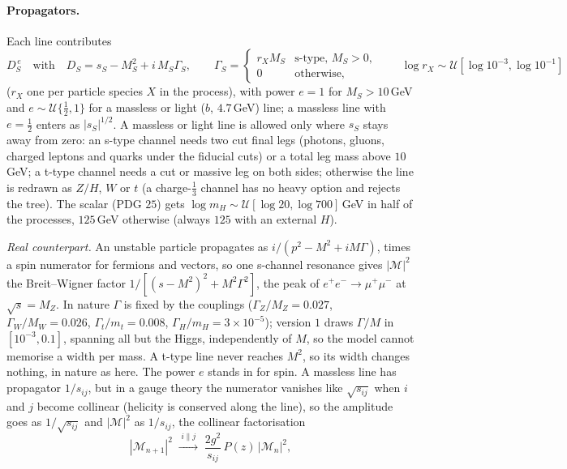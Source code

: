 \documentclass[11pt]{article}
\begin{document}
\paragraph{Propagators.} Each line contributes
\begin{equation}
  D_S^{\,e}\quad\text{with}\quad D_S=s_S-M_S^2+i\,M_S\Gamma_S,\qquad
  \Gamma_S=\begin{cases} r_X M_S & \text{s-type, } M_S>0,\\ 0 & \text{otherwise,}\end{cases}\qquad
  \log r_X\sim\mathcal U[\log10^{-3},\log10^{-1}]
  \label{eq:syn-prop}
\end{equation}
($r_X$ one per particle species $X$ in the process), with power $e=1$ for $M_S>10$\,GeV and $e\sim\mathcal U\{\tfrac12,1\}$
for a massless or light ($b$, $4.7$\,GeV) line; a massless line with $e=\tfrac12$ enters as $|s_S|^{1/2}$. A massless or
light line is allowed only where $s_S$ stays away from zero: an s-type channel needs two cut final legs (photons, gluons,
charged leptons and quarks under the fiducial cuts) or a total leg mass above $10$\,GeV; a t-type channel needs a cut or
massive leg on both sides; otherwise the line is redrawn as $Z/H$, $W$ or $t$ (a charge-$\tfrac13$ channel has no heavy
option and rejects the tree). The scalar (PDG $25$) gets $\log m_H\sim\mathcal U[\log20,\log700]$\,GeV in half of the
processes, $125$\,GeV otherwise (always $125$ with an external $H$).
\par\smallskip\noindent \emph{Real counterpart.} An unstable particle propagates as $i/(p^2-M^2+iM\Gamma)$, times a spin numerator for fermions
and vectors, so one s-channel resonance gives $|\mathcal M|^2$ the Breit--Wigner factor $1/[(s-M^2)^2+M^2\Gamma^2]$, the
peak of $e^+e^-\to\mu^+\mu^-$ at $\sqrt s=M_Z$. In nature $\Gamma$ is fixed by the couplings ($\Gamma_Z/M_Z=0.027$,
$\Gamma_W/M_W=0.026$, $\Gamma_t/m_t=0.008$, $\Gamma_H/m_H=3\times10^{-5}$); version $1$ draws $\Gamma/M$ in
$[10^{-3},0.1]$, spanning all but the Higgs, independently of $M$, so the model cannot memorise a width per mass. A
t-type line never reaches $M^2$, so its width changes nothing, in nature as here. The power $e$ stands in for spin. A
massless line has propagator $1/s_{ij}$, but in a gauge theory the numerator vanishes like $\sqrt{s_{ij}}$ when $i$ and
$j$ become collinear (helicity is conserved along the line), so the amplitude goes as $1/\sqrt{s_{ij}}$ and
$|\mathcal M|^2$ as $1/s_{ij}$, the collinear factorisation
\begin{equation*}
  |\mathcal M_{n+1}|^2\;\xrightarrow{\;i\parallel j\;}\;\frac{2g^2}{s_{ij}}\,P(z)\,|\mathcal M_n|^2 ,
\end{equation*}
\end{document}
